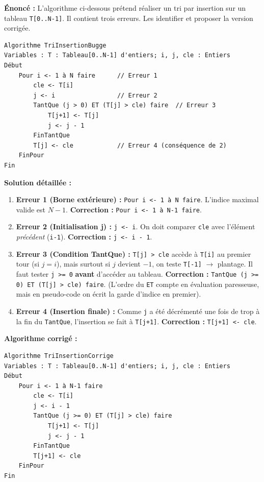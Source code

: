 \documentclass[11pt]{article}
\begin{document}
\begin{exoresolu}
\textbf{Énoncé :} L'algorithme ci-dessous prétend réaliser un tri par insertion sur un tableau \texttt{T[0..N-1]}. Il contient trois erreurs. Les identifier et proposer la version corrigée.

\begin{lstlisting}
Algorithme TriInsertionBugge
Variables : T : Tableau[0..N-1] d'entiers; i, j, cle : Entiers
Début
    Pour i <- 1 à N faire      // Erreur 1
        cle <- T[i]
        j <- i                 // Erreur 2
        TantQue (j > 0) ET (T[j] > cle) faire  // Erreur 3
            T[j+1] <- T[j]
            j <- j - 1
        FinTantQue
        T[j] <- cle            // Erreur 4 (conséquence de 2)
    FinPour
Fin
\end{lstlisting}

\tcblower
\textbf{Solution détaillée :}

\begin{enumerate}
    \item \textbf{Erreur 1 (Borne extérieure) :} \texttt{Pour i <- 1 à N faire}. L'indice maximal valide est $N-1$. \textbf{Correction :} \texttt{Pour i <- 1 à N-1 faire}.
    \item \textbf{Erreur 2 (Initialisation j) :} \texttt{j <- i}. On doit comparer \texttt{cle} avec l'élément \emph{précédent} (\texttt{i-1}). \textbf{Correction :} \texttt{j <- i - 1}.
    \item \textbf{Erreur 3 (Condition TantQue) :} \texttt{T[j] > cle} accède à \texttt{T[i]} au premier tour (si $j=i$), mais surtout si $j$ devient $-1$, on teste \texttt{T[-1]} $\rightarrow$ plantage. Il faut tester \texttt{j >= 0} \textbf{avant} d'accéder au tableau. \textbf{Correction :} \texttt{TantQue (j >= 0) ET (T[j] > cle) faire}. (L'ordre du \texttt{ET} compte en évaluation paresseuse, mais en pseudo-code on écrit la garde d'indice en premier).
    \item \textbf{Erreur 4 (Insertion finale) :} Comme \texttt{j} a été décrémenté une fois de trop à la fin du \texttt{TantQue}, l'insertion se fait à \texttt{T[j+1]}. \textbf{Correction :} \texttt{T[j+1] <- cle}.
\end{enumerate}

\textbf{Algorithme corrigé :}
\begin{lstlisting}
Algorithme TriInsertionCorrige
Variables : T : Tableau[0..N-1] d'entiers; i, j, cle : Entiers
Début
    Pour i <- 1 à N-1 faire
        cle <- T[i]
        j <- i - 1
        TantQue (j >= 0) ET (T[j] > cle) faire
            T[j+1] <- T[j]
            j <- j - 1
        FinTantQue
        T[j+1] <- cle
    FinPour
Fin
\end{lstlisting}
\end{exoresolu}
\end{document}
